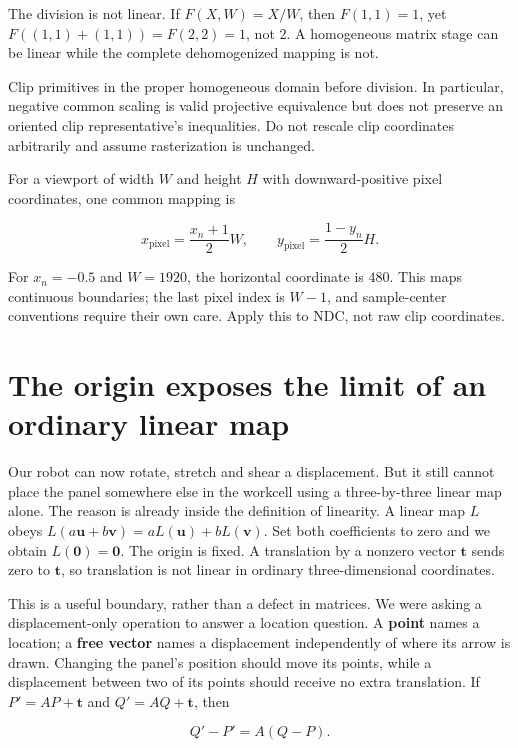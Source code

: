 The division is not linear. If \(F(X,W)=X/W\), then \(F(1,1)=1\), yet \(F((1,1)+(1,1))=F(2,2)=1\), not \(2\). A homogeneous matrix stage can be linear while the complete dehomogenized mapping is not.

Clip primitives in the proper homogeneous domain before division. In particular, negative common scaling is valid projective equivalence but does not preserve an oriented clip representative's inequalities. Do not rescale clip coordinates arbitrarily and assume rasterization is unchanged.

For a viewport of width \(W\) and height \(H\) with downward-positive pixel coordinates, one common mapping is

\[
x_{\mathrm{pixel}}=\frac{x_n+1}{2}W,\qquad
y_{\mathrm{pixel}}=\frac{1-y_n}{2}H.
\]

For \(x_n=-0.5\) and \(W=1920\), the horizontal coordinate is \(480\). This maps continuous boundaries; the last pixel index is \(W-1\), and sample-center conventions require their own care. Apply this to NDC, not raw clip coordinates.

\section{The origin exposes the limit of an ordinary linear map}\label{01-foundations-i-ch018-the-origin-exposes-the-limit-of-an-ordinary-linear-map}

Our robot can now rotate, stretch and shear a displacement. But it still cannot place the panel somewhere else in the workcell using a three-by-three linear map alone. The reason is already inside the definition of linearity. A linear map \(L\) obeys \(L(a\mathbf u+b\mathbf v)=aL(\mathbf u)+bL(\mathbf v)\). Set both coefficients to zero and we obtain \(L(\mathbf0)=\mathbf0\). The origin is fixed. A translation by a nonzero vector \(\mathbf t\) sends zero to \(\mathbf t\), so translation is not linear in ordinary three-dimensional coordinates.

This is a useful boundary, rather than a defect in matrices. We were asking a displacement-only operation to answer a location question. A \textbf{point} names a location; a \textbf{free vector} names a displacement independently of where its arrow is drawn. Changing the panel's position should move its points, while a displacement between two of its points should receive no extra translation. If \(P'=AP+\mathbf t\) and \(Q'=AQ+\mathbf t\), then

\[
Q'-P'=A(Q-P).
\]

